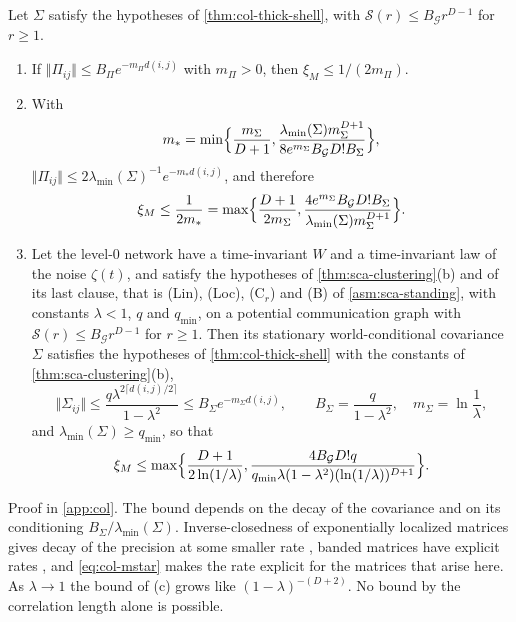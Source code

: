 \begin{theorem}\label{thm:col-markov-bound}
Let $\Sigma$ satisfy the hypotheses of \cref{thm:col-thick-shell}, with $\mathcal S(r)\le B_{\mathcal G}r^{D-1}$ for $r\ge1$.
\begin{enumerate}
\item[(a)] If $\Vert\Pi_{ij}\Vert\le B_\Pi e^{-m_\Pi d(i,j)}$ with $m_\Pi>0$, then $\xi_M\le1/(2m_\Pi)$.
\item[(b)] With
\begin{equation}\label{eq:col-mstar}
m_*=\min\Bigl\{\frac{m_\Sigma}{D+1},\frac{\lambda_{\min}(\Sigma)m_\Sigma^{D+1}}{8e^{m_\Sigma}B_{\mathcal G}D!B_\Sigma}\Bigr\},
\end{equation}
$\Vert\Pi_{ij}\Vert\le2\lambda_{\min}(\Sigma)^{-1}e^{-m_*d(i,j)}$, and therefore
\begin{equation}\label{eq:col-markov-bound}
\xi_M\le\frac1{2m_*}=\max\Bigl\{\frac{D+1}{2m_\Sigma},\frac{4e^{m_\Sigma}B_{\mathcal G}D!B_\Sigma}{\lambda_{\min}(\Sigma)m_\Sigma^{D+1}}\Bigr\}.
\end{equation}
\item[(c)] Let the level-0 network have a time-invariant $W$ and a time-invariant law of the noise $\zeta(t)$, and satisfy the hypotheses of \cref{thm:sca-clustering}(b) and of its last clause, that is \textup{(Lin)}, \textup{(Loc)}, \textup{(C$_r$)} and \textup{(B)} of \cref{asm:sca-standing}, with constants $\lambda<1$, $q$ and $q_{\min}$, on a potential communication graph with $\mathcal S(r)\le B_{\mathcal G}r^{D-1}$ for $r\ge1$. Then its stationary world-conditional covariance $\Sigma$ satisfies the hypotheses of \cref{thm:col-thick-shell} with the constants of \cref{thm:sca-clustering}(b),
\[
\Vert\Sigma_{ij}\Vert\le\frac{q\lambda^{2\lceil d(i,j)/2\rceil}}{1-\lambda^2}\le B_\Sigma e^{-m_\Sigma d(i,j)},\qquad B_\Sigma=\frac q{1-\lambda^2},\quad m_\Sigma=\ln\frac1\lambda,
\]
and $\lambda_{\min}(\Sigma)\ge q_{\min}$, so that
\[
\xi_M\le\max\Bigl\{\frac{D+1}{2\ln(1/\lambda)},\frac{4B_{\mathcal G}D!q}{q_{\min}\lambda(1-\lambda^2)(\ln(1/\lambda))^{D+1}}\Bigr\}.
\]
\end{enumerate}
\end{theorem}
Proof in \cref{app:col}. The bound depends on the decay of the covariance and on its conditioning $B_\Sigma/\lambda_{\min}(\Sigma)$. Inverse-closedness of exponentially localized matrices gives decay of the precision at some smaller rate \citep{jaffard1990proprietes}, banded matrices have explicit rates \citep{demko1984decay}, and \eqref{eq:col-mstar} makes the rate explicit for the matrices that arise here. As $\lambda\to1$ the bound of (c) grows like $(1-\lambda)^{-(D+2)}$. No bound by the correlation length alone is possible.

